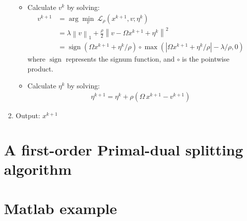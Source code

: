 \documentclass[11pt,a4paper]{article}
\begin{document}
\begin{enumerate}
\begin{itemize}
\item Calculate $v^k $ by solving: 
\begin{equation}
\begin{split}
v^{k+1} &= \arg \min_v \ \mathcal{L_\rho}(x^{k+1},v;\eta^k)  \\
&= \lambda \left \| v \right \|_1+\frac{\rho}{2}\left \| v- \Omega x^{k+1} + \eta^{k}\right \|^2 \\
&= \operatorname{sign}(\Omega x^{k+1} + \eta^k/\rho) \circ \operatorname{max} (|\Omega x^{k+1} + \eta^k/\rho|-{\lambda}/{\rho},0 )
\end{split}
\end{equation}
where $\operatorname{sign}$ represents the signum function, and $\circ$ is the pointwise product. 
\item Calculate $\eta^k $ by solving:
\begin{equation}
\begin{split} 
\eta^{k+1}= \eta^{k}+ \rho (\Omega\,x^{k+1} -v^{k+1} )
\end{split}
\end{equation}
\end{itemize}
\item Output: $x^{k+1}$
\end{enumerate}



\section{A first-order Primal-dual splitting algorithm}


\section{Matlab example}
% 

{}

\end{document}
